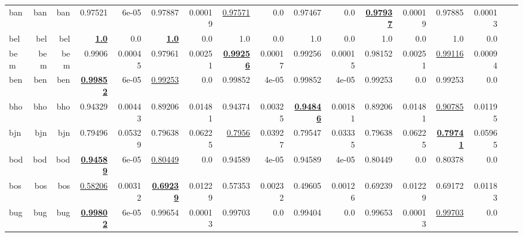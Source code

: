 \documentclass[11pt]{article}
\begin{document}
\begin{table*}[h]
{\begin{tabular}{lrrrrrrrrrrrrrrrr}
ban         & ban         & ban         & 0.97521         & 6e-05         & 0.97887         & 0.00019         & \underline{0.97571}         & 0.0         & 0.97467         & 0.0         & \textbf{\underline{0.97937}}         & 0.00019         & 0.97885         & 0.00013         \\
bel         & bel         & bel         & \textbf{\underline{1.0}}         & 0.0         & \textbf{\underline{1.0}}         & 0.0         & 1.0         & 0.0         & 1.0         & 0.0         & 1.0         & 0.0         & 1.0         & 0.0         \\
bem         & bem         & bem         & 0.9906         & 0.00045         & 0.97961         & 0.00251         & \textbf{\underline{0.99256}}         & 0.00017         & 0.99256         & 0.00015         & 0.98152         & 0.00251         & \underline{0.99116}         & 0.00094         \\
ben         & ben         & ben         & \textbf{\underline{0.99852}}         & 6e-05         & \underline{0.99253}         & 0.0         & 0.99852         & 4e-05         & 0.99852         & 4e-05         & 0.99253         & 0.0         & 0.99253         & 0.0         \\
bho         & bho         & bho         & 0.94329         & 0.00443         & 0.89206         & 0.01481         & 0.94374         & 0.00325         & \textbf{\underline{0.94846}}         & 0.00181         & 0.89206         & 0.01481         & \underline{0.90785}         & 0.01195         \\
bjn         & bjn         & bjn         & 0.79496         & 0.05329         & 0.79638         & 0.06225         & \underline{0.7956}         & 0.03927         & 0.79547         & 0.03335         & 0.79638         & 0.06225         & \textbf{\underline{0.79741}}         & 0.05965         \\
bod         & bod         & bod         & \textbf{\underline{0.94589}}         & 6e-05         & \underline{0.80449}         & 0.0         & 0.94589         & 4e-05         & 0.94589         & 4e-05         & 0.80449         & 0.0         & 0.80378         & 0.0         \\
bos         & bos         & bos         & \underline{0.58206}         & 0.00312         & \textbf{\underline{0.69239}}         & 0.01229         & 0.57353         & 0.00232         & 0.49605         & 0.00126         & 0.69239         & 0.01229         & 0.69172         & 0.01183         \\
bug         & bug         & bug         & \textbf{\underline{0.99802}}         & 6e-05         & 0.99654         & 0.00013         & 0.99703         & 0.0         & 0.99404         & 0.0         & 0.99653         & 0.00013         & \underline{0.99703}         & 0.0         \\

\end{tabular}}
\end{table*}
\end{document}
